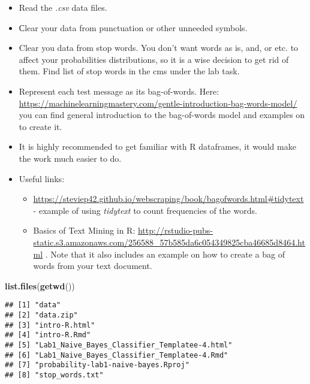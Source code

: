 \documentclass[
]{article}
\newenvironment{Shaded}{\begin{snugshade}}{\end{snugshade}}
\newcommand{\FunctionTok}[1]{\textcolor[rgb]{0.13,0.29,0.53}{\textbf{#1}}}
\newcommand{\NormalTok}[1]{#1}
\providecommand{\tightlist}{%
  \setlength{\itemsep}{0pt}\setlength{\parskip}{0pt}}
\begin{document}
\begin{itemize}
\tightlist
\item
  Read the \emph{.csv} data files.
\item
  Сlear your data from punctuation or other unneeded symbols.
\item
  Clear you data from stop words. You don't want words as is, and, or
  etc. to affect your probabilities distributions, so it is a wise
  decision to get rid of them. Find list of stop words in the cms under
  the lab task.
\item
  Represent each test message as its bag-of-words. Here:
  \url{https://machinelearningmastery.com/gentle-introduction-bag-words-model/}
  you can find general introduction to the bag-of-words model and
  examples on to create it.
\item
  It is highly recommended to get familiar with R dataframes, it would
  make the work much easier to do.
\item
  Useful links:

  \begin{itemize}
  \tightlist
  \item
    \url{https://steviep42.github.io/webscraping/book/bagofwords.html\#tidytext}
    - example of using \emph{tidytext} to count frequencies of the
    words.
  \item
    Basics of Text Mining in R:
    \url{http://rstudio-pubs-static.s3.amazonaws.com/256588_57b585da6c054349825cba46685d8464.html}
    . Note that it also includes an example on how to create a bag of
    words from your text document.
  \end{itemize}
\end{itemize}

\begin{Shaded}
\begin{Highlighting}[]
\FunctionTok{list.files}\NormalTok{(}\FunctionTok{getwd}\NormalTok{())}
\end{Highlighting}
\end{Shaded}

\begin{verbatim}
## [1] "data"                                        
## [2] "data.zip"                                    
## [3] "intro-R.html"                                
## [4] "intro-R.Rmd"                                 
## [5] "Lab1_Naive_Bayes_Classifier_Templatee-4.html"
## [6] "Lab1_Naive_Bayes_Classifier_Templatee-4.Rmd" 
## [7] "probability-lab1-naive-bayes.Rproj"          
## [8] "stop_words.txt"
\end{verbatim}
\end{document}
